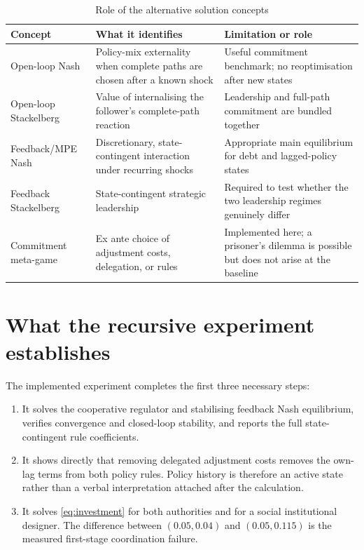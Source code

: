 \documentclass[11pt]{article}
\begin{document}
\begin{table}[htbp]
\centering
\caption{Role of the alternative solution concepts}
\label{tab:concepts}
\small
\begin{tabular}{P{0.22\textwidth}P{0.30\textwidth}P{0.37\textwidth}}
\toprule
Concept & What it identifies & Limitation or role\\
\midrule
Open-loop Nash & Policy-mix externality when complete paths are chosen after a
known shock & Useful commitment benchmark; no reoptimisation after new states\\
Open-loop Stackelberg & Value of internalising the follower's complete-path
reaction & Leadership and full-path commitment are bundled together\\
Feedback/MPE Nash & Discretionary, state-contingent interaction under recurring
shocks & Appropriate main equilibrium for debt and lagged-policy states\\
Feedback Stackelberg & State-contingent strategic leadership & Required to test
whether the two leadership regimes genuinely differ\\
Commitment meta-game & Ex ante choice of adjustment costs, delegation, or rules
& Implemented here; a prisoner's dilemma is possible but does not arise at the baseline\\
\bottomrule
\end{tabular}
\end{table}

\section{What the recursive experiment establishes}

The implemented experiment completes the first three necessary steps:

\begin{enumerate}
  \item It solves the cooperative regulator and stabilising feedback Nash
  equilibrium, verifies convergence and closed-loop stability, and reports the
  full state-contingent rule coefficients.
  \item It shows directly that removing delegated adjustment costs removes the
  own-lag terms from both policy rules.  Policy history is therefore an active
  state rather than a verbal interpretation attached after the calculation.
  \item It solves \eqref{eq:investment} for both authorities and for a social
  institutional designer.  The difference between $(0.05,0.04)$ and
  $(0.05,0.115)$ is the measured first-stage coordination failure.
\end{enumerate}
\end{document}
